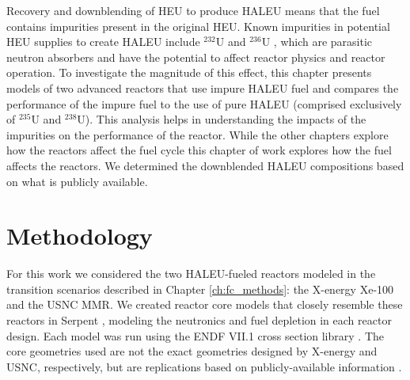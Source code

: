 Recovery and downblending of \gls{HEU} to produce \gls{HALEU} means that 
the fuel contains impurities present in the original
\gls{HEU}. Known impurities in potential \gls{HEU}
supplies to create \gls{HALEU} include $^{232}$U and $^{236}$U
\cite{vaden_isotopic_2018,nelson_foreign_2010},  
which are parasitic neutron absorbers and have the potential to affect 
reactor physics and reactor operation. To investigate the magnitude of this 
effect, this chapter presents models of two advanced reactors that use  
impure \gls{HALEU} fuel and compares the performance of the impure 
fuel to the use of pure 
\gls{HALEU} (comprised exclusively of $^{235}$U and $^{238}$U). This analysis 
helps in understanding the impacts of the impurities on the performance 
of the reactor. While the other chapters explore how the reactors affect 
the fuel cycle this chapter of work explores how the fuel affects the 
reactors.  We determined 
the downblended \gls{HALEU} compositions based on what is publicly 
available. 

\section{Methodology}\label{sec:neutronics-methods}
For this work we considered the two \gls{HALEU}-fueled reactors modeled 
in the transition scenarios described in Chapter \ref{ch:fc_methods}: the 
X-energy Xe-100 and the \gls{USNC} \gls{MMR}. We created reactor 
core models that closely resemble these reactors in Serpent 
\cite{leppanen_serpent_2014}, modeling the neutronics and fuel depletion  
in each reactor design. Each model was run using the ENDF VII.1 
cross section library
\cite{chadwick_endfb-vii1_2011}. The core geometries used are not 
the exact geometries designed by X-energy and \gls{USNC}, respectively, but 
are replications based on publicly-available information 
\cite{mulder_overview_2021,nuscale_chapter_2020,reyes_nuscale_2021,reyes_correction_2022}. 

